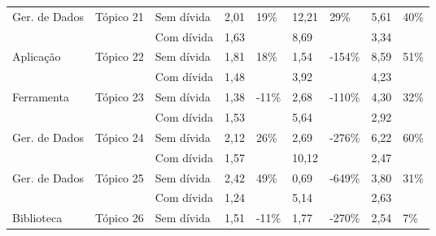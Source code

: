 \begin{longtable}{|l|l|l|l|l|l|l|l|l|}
\multirow{2}{*}{Ger. de Dados} & \multirow{2}{*}{Tópico 21} & Sem dívida              & 2,01            & \multirow{2}{*}{19\%}   & 12,21           & \multirow{2}{*}{29\%}    & 5,61            & \multirow{2}{*}{40\%}   \\ \cline{3-4} \cline{6-6} \cline{8-8}
                               &                            & Com dívida           & 1,63            &                         & 8,69            &                          & 3,34            &                         \\ \hline
\multirow{2}{*}{Aplicação}     & \multirow{2}{*}{Tópico 22} & Sem dívida              & 1,81            & \multirow{2}{*}{18\%}   & 1,54            & \multirow{2}{*}{-154\%}  & 8,59            & \multirow{2}{*}{51\%}   \\ \cline{3-4} \cline{6-6} \cline{8-8}
                               &                            & Com dívida           & 1,48            &                         & 3,92            &                          & 4,23            &                         \\ \hline
\multirow{2}{*}{Ferramenta}    & \multirow{2}{*}{Tópico 23} & Sem dívida              & 1,38            & \multirow{2}{*}{-11\%}  & 2,68            & \multirow{2}{*}{-110\%}  & 4,30            & \multirow{2}{*}{32\%}   \\ \cline{3-4} \cline{6-6} \cline{8-8}
                               &                            & Com dívida           & 1,53            &                         & 5,64            &                          & 2,92            &                         \\ \hline
\multirow{2}{*}{Ger. de Dados} & \multirow{2}{*}{Tópico 24} & Sem dívida              & 2,12            & \multirow{2}{*}{26\%}   & 2,69            & \multirow{2}{*}{-276\%}  & 6,22            & \multirow{2}{*}{60\%}   \\ \cline{3-4} \cline{6-6} \cline{8-8}
                               &                            & Com dívida           & 1,57            &                         & 10,12           &                          & 2,47            &                         \\ \hline
\multirow{2}{*}{Ger. de Dados} & \multirow{2}{*}{Tópico 25} & Sem dívida              & 2,42            & \multirow{2}{*}{49\%}   & 0,69            & \multirow{2}{*}{-649\%}  & 3,80            & \multirow{2}{*}{31\%}   \\ \cline{3-4} \cline{6-6} \cline{8-8}
                               &                            & Com dívida           & 1,24            &                         & 5,14            &                          & 2,63            &                         \\ \hline
\multirow{2}{*}{Biblioteca}    & \multirow{2}{*}{Tópico 26} & Sem dívida              & 1,51            & \multirow{2}{*}{-11\%}  & 1,77            & \multirow{2}{*}{-270\%}  & 2,54            & \multirow{2}{*}{7\%}    \\ \cline{3-4} \cline{6-6} \cline{8-8}


\end{longtable}
